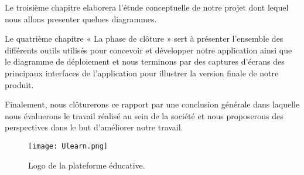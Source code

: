Le troisième chapitre elaborera l’étude conceptuelle de notre projet dont lequel nous allons
presenter quelues diagrammes.

\medskip

Le quatrième chapitre « La phase de clôture » sert à présenter l’ensemble des différents outils
utilisés pour concevoir et développer notre application ainsi que le diagramme de déploiement
et nous terminons par des captures d’écrans des principaux interfaces de l’application pour
illustrer la version finale de notre produit.

\medskip

Finalement, nous clôturerons ce rapport par une conclusion générale dans laquelle nous évaluerons le travail réalisé au sein de la société et nous proposerons des perspectives dans le but
d’améliorer notre travail.

\medskip
\medskip
\medskip
\medskip
\medskip
\medskip
\medskip
\medskip
\medskip
\medskip
\medskip
\medskip
\medskip
\medskip
\medskip
\medskip
\medskip
\medskip
\medskip
\medskip
\medskip
\medskip
\medskip
\medskip
\medskip
\medskip
\medskip
\medskip

\begin{figure}[hbt!]
	\centering
	\texttt{[image: Ulearn.png]}
	\caption{Logo de la plateforme éducative.}
	\label{fig:Logo de la plateforme éducative}
\end{figure}